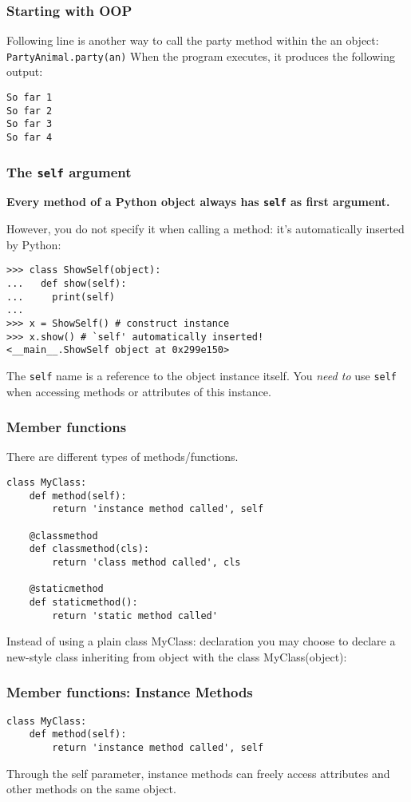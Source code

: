 \begin{frame}[fragile]\frametitle{Starting with OOP}
Following line is another way to call the party method within
the an object: \lstinline|PartyAnimal.party(an)|
When the program executes, it produces the following output:
\begin{lstlisting}
So far 1
So far 2
So far 3
So far 4
\end{lstlisting}
\end{frame}


\begin{frame}[fragile]\frametitle{The \texttt{self} argument}

  \textbf{Every method of a Python object always has \texttt{self}
    as first argument.}

  
  However, you do not specify it when calling a method: it's
  automatically inserted by Python:
\begin{lstlisting}
>>> class ShowSelf(object):
...   def show(self):
...     print(self)
...
>>> x = ShowSelf() # construct instance
>>> x.show() # `self' automatically inserted!
<__main__.ShowSelf object at 0x299e150>
\end{lstlisting}

  
  The \texttt{self} name is a reference to the object instance
  itself.  You \emph{need to} use \texttt{self} when accessing methods
  or attributes of this instance.
\end{frame}

\begin{frame}[fragile]\frametitle{Member functions}
There are different types of methods/functions.
\begin{lstlisting}
class MyClass:
    def method(self):
        return 'instance method called', self

    @classmethod
    def classmethod(cls):
        return 'class method called', cls

    @staticmethod
    def staticmethod():
        return 'static method called'
\end{lstlisting}
Instead of using a plain class MyClass: declaration you may choose to declare a new-style class inheriting from object with the class MyClass(object):
\end{frame}


\begin{frame}[fragile]\frametitle{Member functions: Instance Methods}

\begin{lstlisting}
class MyClass:
    def method(self):
        return 'instance method called', self
\end{lstlisting}
Through the self parameter, instance methods can freely access attributes and other methods on the same object. 

\end{frame}


